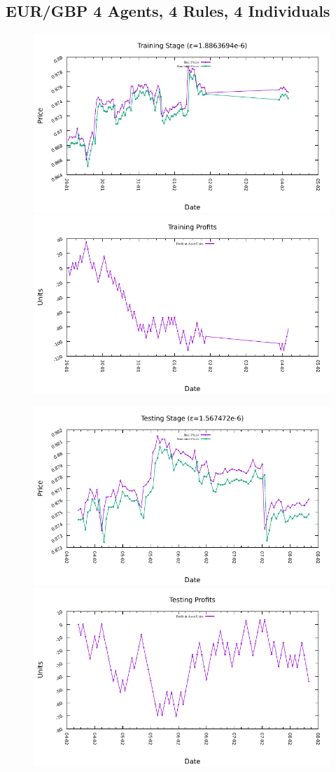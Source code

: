 







\subsection{EUR/GBP 4 Agents, 4 Rules, 4 Individuals}
\label{results:forecast-eur-gbp-4agents-4rules-4individuals}

\begin{figure}[htp]
  \centering

  \includegraphics[width=.45\textwidth]{img/plots/eur_gbp_h1-4agents-4rules-4ind-100gen_training_fit.pdf}\quad
  \includegraphics[width=.45\textwidth]{img/plots/eur_gbp_h1-4agents-4rules-4ind-100gen_training_profits.pdf}

  \medskip

  \includegraphics[width=.45\textwidth]{img/plots/eur_gbp_h1-4agents-4rules-4ind-100gen_testing_fit.pdf}\quad
  \includegraphics[width=.45\textwidth]{img/plots/eur_gbp_h1-4agents-4rules-4ind-100gen_testing_profits.pdf}


\end{figure}
